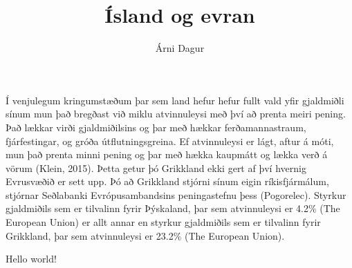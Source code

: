 \documentclass{article}
\title{Ísland og evran}
\author{Árni Dagur}
\begin{document}
\maketitle

Í venjulegum kringumstæðum þar sem land hefur hefur fullt vald yfir gjaldmiðli sínum mun það bregðast við miklu atvinnuleysi með því að prenta meiri pening. Það lækkar virði gjaldmiðilsins og þar með hækkar ferðamannastraum, fjárfestingar, og gróða útflutningsgreina. Ef atvinnuleysi er lágt, aftur á móti, mun það prenta minni pening og þar með hækka kaupmátt og lækka verð á vörum (Klein, 2015). Þetta getur þó Grikkland ekki gert af því hvernig Evrusvæðið er sett upp. Þó að Grikkland stjórni sínum eigin ríkisfjármálum, stjórnar Seðlabanki Evrópusambandsins  peningastefnu þess (Pogorelec). Styrkur gjaldmiðils sem er tilvalinn fyrir Þýskaland, þar sem atvinnuleysi er 4.2\% (The European Union) er allt annar en styrkur gjaldmiðils sem er tilvalinn fyrir Grikkland, þar sem atvinnuleysi er 23.2\% (The European Union).

Hello world!
\end{document}
